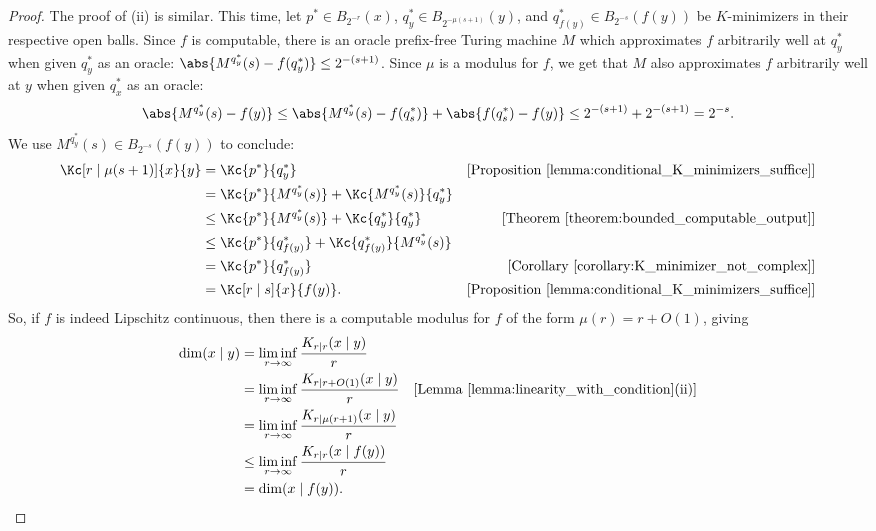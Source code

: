 \begin{proof}
    The proof of (ii) is similar. This time, let $p^* \in B_{2^{-r}}(x)$, $q_y^* \in B_{2^{-\mu(s + 1)}}(y)$, and $q_{f(y)}^* \in B_{2^{-s}}(f(y))$ be $K$-minimizers in their respective open balls. Since $f$ is computable, there is an oracle prefix-free Turing machine $M$ which approximates $f$ arbitrarily well at $q^*_y$ when given $q^*_y$ as an oracle: $\abs{M^{q^*_y}(s) - f(q^*_y)} \leq 2^{-(s + 1)}$. Since $\mu$ is a modulus for $f$, we get that $M$ also approximates $f$ arbitrarily well at $y$ when given $q^*_x$ as an oracle:
    \begin{align*}
        \abs{M^{q^*_y}(s) - f(y)} \leq \abs{M^{q^*_y}(s) - f(q^*_s)} + \abs{f(q^*_s) - f(y)} \leq 2^{-(s + 1)} + 2^{-(s + 1)} = 2^{-s}.
    \end{align*}
    We use $M^{q^*_y}(s) \in B_{2^{-s}}(f(y))$ to conclude:
    \begin{align*}
        \Kc[r \mid \mu(s + 1)]{x}{y} &= \Kc{p^*}{q^*_y} & [\text{Proposition~\ref{lemma:conditional_K_minimizers_suffice}}]\\
        &= \Kc{p^*}{M^{q^*_y}(s)} + \Kc{M^{q^*_y}(s)}{q^*_y}\\
        &\leq \Kc{p^*}{M^{q^*_y}(s)} + \Kc{q^*_y}{q^*_y} & [\text{Theorem~\ref{theorem:bounded_computable_output}}]\\
        &\leq \Kc{p^*}{q^*_{f(y)}} + \Kc{q^*_{f(y)}}{M^{q^*_y}(s)} \\
        &= \Kc{p^*}{q^*_{f(y)}} & [\text{Corollary~\ref{corollary:K_minimizer_not_complex}}]\\
        &= \Kc[r \mid s]{x}{f(y)}. & [\text{Proposition~\ref{lemma:conditional_K_minimizers_suffice}}]
    \end{align*}
    So, if $f$ is indeed Lipschitz continuous, then there is a computable modulus for $f$ of the form $\mu(r) = r + O(1)$, giving
    \begin{align*}
        \dim(x \mid y) &= \liminf_{r \to \infty} \frac{K_{r \mid r}(x \mid y)}{r}\\
        &= \liminf_{r \to \infty} \frac{K_{r \mid r + O(1)}(x \mid y)}{r} & [\text{Lemma~\ref{lemma:linearity_with_condition}(ii)}]\\
        &= \liminf_{r \to \infty} \frac{K_{r \mid \mu(r + 1)}(x \mid y)}{r} \\
        &\leq \liminf_{r \to \infty} \frac{K_{r \mid r}(x \mid f(y))}{r}\\
        &= \dim(x \mid f(y)).
    \end{align*}
\end{proof}

